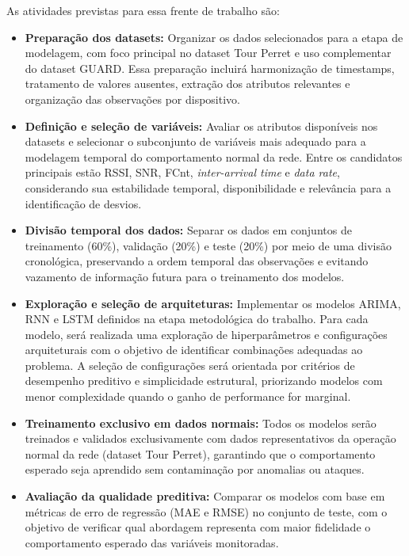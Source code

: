 As atividades previstas para essa frente de trabalho são:
\begin{itemize}
    \item \textbf{Preparação dos datasets:} Organizar os dados selecionados para a etapa de modelagem, com foco principal no dataset Tour Perret e uso complementar do dataset GUARD. Essa preparação incluirá harmonização de timestamps, tratamento de valores ausentes, extração dos atributos relevantes e organização das observações por dispositivo.

    \item \textbf{Definição e seleção de variáveis:} Avaliar os atributos disponíveis nos datasets e selecionar o subconjunto de variáveis mais adequado para a modelagem temporal do comportamento normal da rede. Entre os candidatos principais estão RSSI, SNR, FCnt, \textit{inter-arrival time} e \textit{data rate}, considerando sua estabilidade temporal, disponibilidade e relevância para a identificação de desvios.

    \item \textbf{Divisão temporal dos dados:} Separar os dados em conjuntos de treinamento (60\%), validação (20\%) e teste (20\%) por meio de uma divisão cronológica, preservando a ordem temporal das observações e evitando vazamento de informação futura para o treinamento dos modelos.

    \item \textbf{Exploração e seleção de arquiteturas:} Implementar os modelos ARIMA, RNN e LSTM definidos na etapa metodológica do trabalho. Para cada modelo, será realizada uma exploração de hiperparâmetros e configurações arquiteturais com o objetivo de identificar combinações adequadas ao problema. A seleção de configurações será orientada por critérios de desempenho preditivo e simplicidade estrutural, priorizando modelos com menor complexidade quando o ganho de performance for marginal.

    \item \textbf{Treinamento exclusivo em dados normais:} Todos os modelos serão treinados e validados exclusivamente com dados representativos da operação normal da rede (dataset Tour Perret), garantindo que o comportamento esperado seja aprendido sem contaminação por anomalias ou ataques.

    \item \textbf{Avaliação da qualidade preditiva:} Comparar os modelos com base em métricas de erro de regressão (MAE e RMSE) no conjunto de teste, com o objetivo de verificar qual abordagem representa com maior fidelidade o comportamento esperado das variáveis monitoradas.


\end{itemize}

